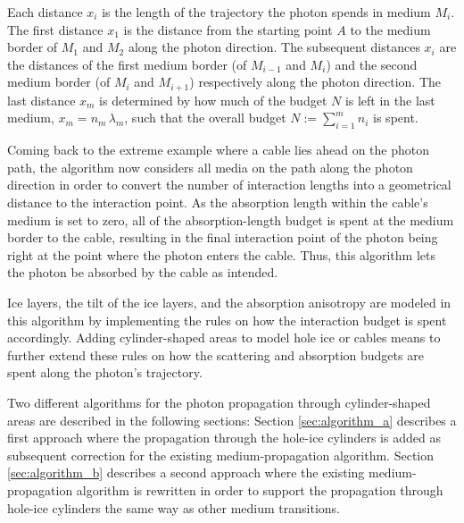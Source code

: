 Each distance $x_i$ is the length of the trajectory the photon spends in medium $M_i$. The first distance $x_1$ is the distance from the starting point $A$ to the medium border of $M_1$ and $M_2$ along the photon direction. The subsequent distances $x_i$ are the distances of the first medium border (of $M_{i-1}$ and $M_i$) and the second medium border (of $M_i$ and $M_{i+1}$) respectively along the photon direction. The last distance $x_m$ is determined by how much of the budget $N$ is left in the last medium, $x_m = n_m\,\lambda_m$, such that the overall budget $N:=\sum_{i=1}^m n_i$ is spent.

Coming back to the extreme example where a cable lies ahead on the photon path, the algorithm now considers all media on the path along the photon direction in order to convert the number of interaction lengths into a geometrical distance to the interaction point. As the absorption length within the cable's medium is set to zero, all of the absorption-length budget is spent at the medium border to the cable, resulting in the final interaction point of the photon being right at the point where the photon enters the cable. Thus, this algorithm lets the photon be absorbed by the cable as intended.

Ice layers, the tilt of the ice layers, and the absorption anisotropy are modeled in this algorithm by implementing the rules on how the interaction budget is spent accordingly.
Adding cylinder-shaped areas to model hole ice or cables means to further extend these rules on how the scattering and absorption budgets are spent along the photon's trajectory.

Two different algorithms for the photon propagation through cylinder-shaped areas are described in the following sections: Section \ref{sec:algorithm_a} describes a first approach where the propagation through the hole-ice cylinders is added as subsequent correction for the existing medium-propagation algorithm. Section \ref{sec:algorithm_b} describes a second approach where the existing medium-propagation algorithm is rewritten in order to support the propagation through hole-ice cylinders the same way as other medium transitions.
